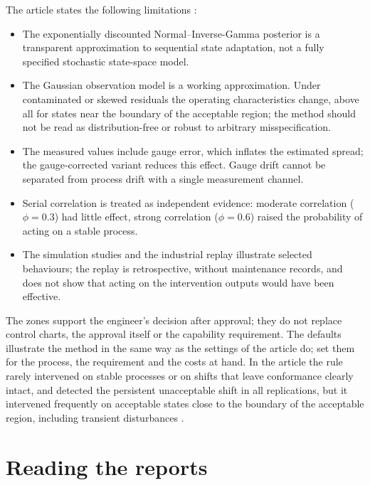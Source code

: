 \documentclass[a4paper,11pt,oneside,openany,parskip=half-,headings=standardclasses,toc=flat,numbers=noenddot]{scrbook}
\begin{document}
The article states the following limitations \cite[Secs.~5.5, 6]{jy-monitor}:
\begin{itemize}
\item The exponentially discounted Normal--Inverse-Gamma posterior is a transparent approximation to sequential state
  adaptation, not a fully specified stochastic state-space model.
\item The Gaussian observation model is a working approximation. Under contaminated or skewed residuals the operating
  characteristics change, above all for states near the boundary of the acceptable region; the method should not be
  read as distribution-free or robust to arbitrary misspecification.
\item The measured values include gauge error, which inflates the estimated spread; the gauge-corrected variant reduces
  this effect. Gauge drift cannot be separated from process drift with a single measurement channel.
\item Serial correlation is treated as independent evidence: moderate correlation ($\phi = 0.3$) had little effect,
  strong correlation ($\phi = 0.6$) raised the probability of acting on a stable process.
\item The simulation studies and the industrial replay illustrate selected behaviours; the replay is retrospective,
  without maintenance records, and does not show that acting on the intervention outputs would have been effective.
\end{itemize}

\begin{caution}[Scope]
The zones support the engineer's decision after approval; they do not replace control charts, the approval itself or
the capability requirement. The defaults illustrate the method in the same way as the settings of the article do;
set them for the process, the requirement and the costs at hand. In the article the rule rarely intervened on stable
processes or on shifts that leave conformance clearly intact, and detected the persistent unacceptable shift in all
replications, but it intervened frequently on acceptable states close to the boundary of the acceptable region,
including transient disturbances \cite[Secs.~5.4, 7]{jy-monitor}.
\end{caution}

\chapter{Reading the reports}\label{ch:reports}
\end{document}
